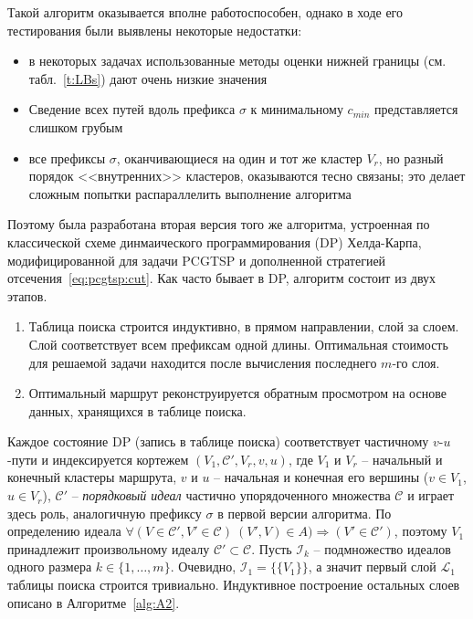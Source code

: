 Такой алгоритм оказывается вполне работоспособен,
однако в ходе его тестирования были выявлены некоторые недостатки:
\begin{itemize}
    \item
    в некоторых задачах использованные методы
    оценки нижней границы 
    (см. табл.~\ref{t:LBs})
    дают очень низкие значения
    \item 
    Сведение всех путей вдоль префикса $\sigma$
    к минимальному $c_{min}$
    представляется слишком грубым
    \item 
    все префиксы $\sigma$,
    оканчивающиеся на один и тот же
    кластер $V_r$,
    но разный порядок <<внутренних>> кластеров,
    оказываются тесно связаны;
    это делает сложным попытки распараллелить
    выполнение алгоритма
\end{itemize}
Поэтому была разработана вторая версия того же алгоритма,
устроенная по классической схеме 
динмаического программирования (DP)
Хелда-Карпа,
модифицированной для задачи PCGTSP
и дополненной стратегией отсечения~\eqref{eq:pcgtsp:cut}.
Как часто бывает в DP,
алгоритм состоит из двух этапов.
\begin{enumerate}
  \item
  Таблица поиска строится индуктивно,
  в прямом направлении, 
  слой за слоем.
  Слой соответствует всем префиксам одной длины.
  Оптимальная стоимость для решаемой задачи
  находится после вычисления последнего $m$-го слоя.   
  \item
  Оптимальный маршрут реконструируется обратным просмотром 
  на основе данных, 
  хранящихся в таблице поиска.
\end{enumerate}

Каждое состояние DP
(запись в таблице поиска)
соответствует частичному 
$v$-$u$-пути
и индексируется кортежем
$(V_1, \mathcal C',V_r,v, u)$, где
$V_1$ и $V_r$ -- начальный и конечный кластеры маршрута,
$v$ и $u$ -- начальная и конечная его вершины ($v\in V_1$, $u\in V_r$),
$\mathcal C'$ -- {\it порядковый идеал} частично упорядоченного множества $\mathcal C$
и играет здесь роль, аналогичную префиксу $\sigma$
в первой версии алгоритма.
По определению идеала
\(
    \forall (V\in\mathcal C', V'\in\mathcal C)\   (V',V)\in A) 
    \Rightarrow (V'\in\mathcal C')
\),
поэтому $V_1$ 
принадлежит произвольному идеалу
$\mathcal C'\subset\mathcal C$.
Пусть $\mathcal I_k$
-- подмножество идеалов одного размера
$k\in\{1,\ldots,m\}$. 
Очевидно,
$\mathcal I_1=\{\{V_1\}\}$, 
а значит первый слой
$\mathcal L_1$
таблицы поиска строится тривиально.
Индуктивное построение остальных слоев
описано в Алгоритме~\ref{alg:A2}.

